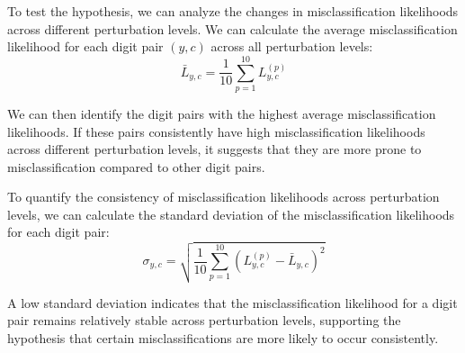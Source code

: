 To test the hypothesis, we can analyze the changes in misclassification likelihoods across different perturbation levels. We can calculate the average misclassification likelihood for each digit pair $(y, c)$ across all perturbation levels:
\begin{equation}
\bar{L}_{y,c} = \frac{1}{10} \sum_{p=1}^{10} L^{(p)}_{y,c}    
\end{equation}

We can then identify the digit pairs with the highest average misclassification likelihoods. If these pairs consistently have high misclassification likelihoods across different perturbation levels, it suggests that they are more prone to misclassification compared to other digit pairs.

To quantify the consistency of misclassification likelihoods across perturbation levels, we can calculate the standard deviation of the misclassification likelihoods for each digit pair:
\begin{equation}
\sigma_{y,c} = \sqrt{\frac{1}{10} \sum_{p=1}^{10} (L^{(p)}_{y,c} - \bar{L}_{y,c})^2}    
\end{equation}


A low standard deviation indicates that the misclassification likelihood for a digit pair remains relatively stable across perturbation levels, supporting the hypothesis that certain misclassifications are more likely to occur consistently.
